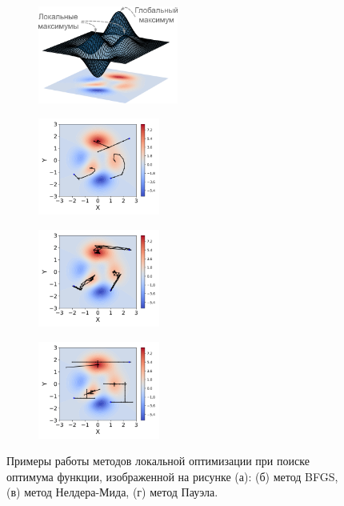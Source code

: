 \begin{figure}[t]
    \begin{subfigure}[b]{\textwidth}
    \centering
    \includegraphics[height=3.2cm]{images/part1/opt/example_3d.png}
    \caption{}
    \label{fig:part1:opt:opt_example_3d}
    \end{subfigure}
    \begin{subfigure}[b]{.33\textwidth}
    \includegraphics[height=3.2cm]{images/part1/opt/example_bfgs.png}
    \caption{}
    \label{fig:part1:opt:opt_example_bfgs}
    \end{subfigure}%
    \begin{subfigure}[b]{.33\textwidth}
    \includegraphics[height=3.2cm]{images/part1/opt/example_nelder_mead.png}
    \caption{}
    \label{fig:part1:opt:opt_example_nelder_mead}
    \end{subfigure}%
    \begin{subfigure}[b]{.33\textwidth}
    \includegraphics[height=3.2cm]{images/part1/opt/example_powell.png}
    \caption{}
    \label{fig:part1:opt:opt_example_powell}
    \end{subfigure}
    \caption{Примеры работы методов локальной оптимизации при поиске оптимума функции, изображенной на рисунке (а): (б) метод BFGS, (в) метод Нелдера-Мида, (г) метод Пауэла.}\label{fig:part1:opt:opt_example}
\end{figure}

